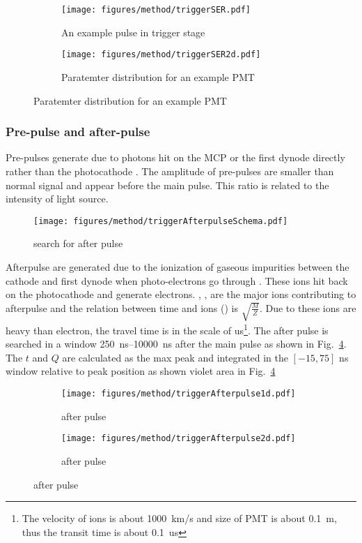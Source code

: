 \begin{figure}
    \centering
    \begin{subfigure}[t]{0.47\textwidth}
        \texttt{[image: figures/method/triggerSER.pdf]}
        \caption{An example pulse in trigger stage}
        \label{fig:triggerser}
    \end{subfigure}
    \begin{subfigure}[t]{0.47\textwidth}
        \texttt{[image: figures/method/triggerSER2d.pdf]}
        \caption{Paratemter distribution  for an example PMT}
        \label{fig:triggerser2d}
    \end{subfigure}
\end{figure}
\subsubsection{Pre-pulse and after-pulse}
Pre-pulses generate due to photons hit on the MCP or the first dynode directly rather than the photocathode \cite{JUNOMassTesting}. The amplitude of pre-pulses are smaller than normal signal and appear before the main pulse. This ratio is related to the intensity of light source.
\begin{figure}
    \centering
    \texttt{[image: figures/method/triggerAfterpulseSchema.pdf]}
    \caption{search for after pulse}
    \label{fig:afterpulseSchema}
\end{figure}

Afterpulse are generated due to the ionization of gaseous impurities between the cathode and first dynode when photo-electrons go through \cite{Coates_1973}. These ions hit back on the photocathode and generate electrons. , ,  are the major ions contributing to afterpulse and the relation between time and ions () is $\sqrt{\frac{M}{Z}}$\cite{Coates_1973}. Due to these ions are heavy than electron, the travel time is in the scale of \si{us}\footnote{The velocity of ions is about \SI{1000}{km/s} and size of PMT is about \SI{0.1}{m}, thus the transit time is about \SI{0.1}{us}}. The after pulse is searched in a window \SIrange{250}{10000}{ns} after the main pulse as shown in Fig.~\ref{fig:afterpulseSchema}. The $t$ and $Q$ are calculated as the max peak and integrated in the $[-15,75]$ ns window relative to peak position as shown violet area in Fig.~\ref{fig:afterpulseSchema}
\begin{figure}[!htbp]
    \centering
    \begin{subfigure}[t]{0.8\textwidth}
        \texttt{[image: figures/method/triggerAfterpulse1d.pdf]}
        \caption{after pulse}
        \label{fig:afterpulse1d}
    \end{subfigure}
    \begin{subfigure}[t]{0.8\textwidth}
        \texttt{[image: figures/method/triggerAfterpulse2d.pdf]}
        \caption{after pulse}
        \label{fig:afterpulse2d}
    \end{subfigure}
\end{figure}


